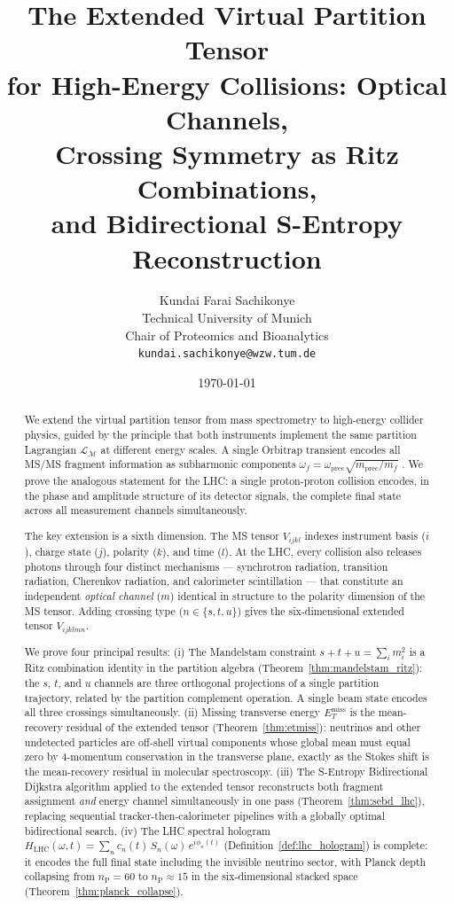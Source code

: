\documentclass[twocolumn,10pt,a4paper]{article}
\title{\textbf{The Extended Virtual Partition Tensor\\
for High-Energy Collisions: Optical Channels,\\
Crossing Symmetry as Ritz Combinations,\\
and Bidirectional S-Entropy Reconstruction}}
\author{
Kundai Farai Sachikonye\\
Technical University of Munich\\
Chair of Proteomics and Bioanalytics\\
\texttt{kundai.sachikonye@wzw.tum.de}
}
\date{\today}
\theoremstyle{thmstyle}
\theoremstyle{definition}
\theoremstyle{remark}
\newcommand{\nP}{n_{\mathrm{P}}}
\newcommand{\LM}{\mathcal{L}_{\mathcal{M}}}
\newcommand{\Hologram}{H_{\mathrm{LHC}}}
\newcommand{\ETmiss}{E_{T}^{\mathrm{miss}}}
\begin{document}
\maketitle

\begin{abstract}
\noindent
We extend the virtual partition tensor from mass spectrometry to high-energy
collider physics, guided by the principle that both instruments implement
the same partition Lagrangian $\LM$ at different energy scales.  A single
Orbitrap transient encodes all MS/MS fragment information as subharmonic
components $\omega_f = \omega_\text{prec}\sqrt{m_\text{prec}/m_f}$
\citep{companion:tensor}.  We prove the analogous statement for the LHC:
a single proton-proton collision encodes, in the phase and amplitude
structure of its detector signals, the complete final state across all
measurement channels simultaneously.

The key extension is a sixth dimension.  The MS tensor $V_{ijkl}$ indexes
instrument basis ($i$), charge state ($j$), polarity ($k$), and time ($l$).
At the LHC, every collision also releases photons through four distinct
mechanisms --- synchrotron radiation, transition radiation, Cherenkov
radiation, and calorimeter scintillation --- that constitute an independent
\emph{optical channel} ($m$) identical in structure to the polarity dimension
of the MS tensor.  Adding crossing type ($n \in \{s, t, u\}$) gives the
six-dimensional extended tensor $V_{ijklmn}$.

We prove four principal results:
(i) The Mandelstam constraint $s + t + u = \sum_i m_i^2$
is a Ritz combination identity in the partition algebra
(Theorem~\ref{thm:mandelstam_ritz}): the $s$, $t$, and $u$ channels are
three orthogonal projections of a single partition trajectory, related by
the partition complement operation.  A single beam state encodes all three
crossings simultaneously.
(ii) Missing transverse energy $\ETmiss$ is the mean-recovery residual of
the extended tensor (Theorem~\ref{thm:etmiss}): neutrinos and other
undetected particles are off-shell virtual components whose global mean
must equal zero by 4-momentum conservation in the transverse plane, exactly
as the Stokes shift is the mean-recovery residual in molecular spectroscopy.
(iii) The S-Entropy Bidirectional Dijkstra algorithm
\citep{companion:sebd} applied to the extended tensor reconstructs both
fragment assignment \emph{and} energy channel simultaneously in one pass
(Theorem~\ref{thm:sebd_lhc}), replacing sequential tracker-then-calorimeter
pipelines with a globally optimal bidirectional search.
(iv) The LHC spectral hologram
$\Hologram(\omega, t) = \sum_n c_n(t)\,S_n(\omega)\,e^{i\phi_n(t)}$
(Definition~\ref{def:lhc_hologram}) is complete: it encodes the full final
state including the invisible neutrino sector, with Planck depth collapsing
from $\nP = 60$ to $\nP \approx 15$ in the six-dimensional stacked space
(Theorem~\ref{thm:planck_collapse}).


\end{abstract}
\end{document}
